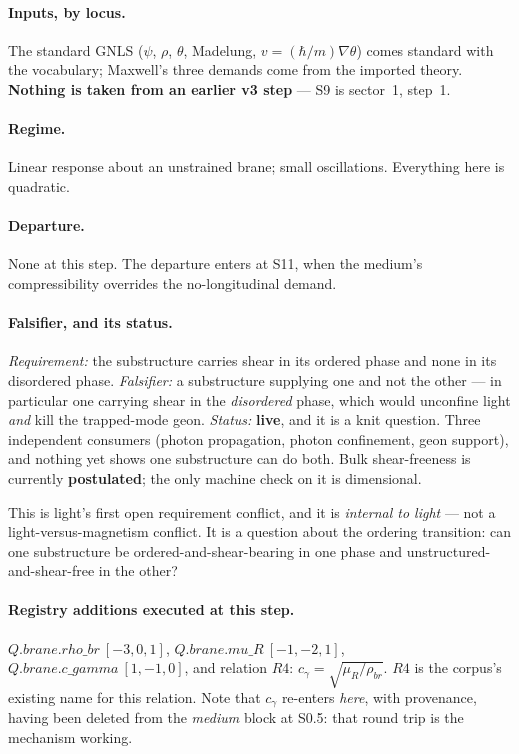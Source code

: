 \paragraph{Inputs, by locus.}
The standard GNLS (\(\psi\), \(\rho\), \(\theta\), Madelung,
\(v=(\hbar/m)\nabla\theta\)) comes standard with the vocabulary; Maxwell's three
demands come from the imported theory. \textbf{Nothing is taken from an earlier
v3 step} --- S9 is sector~1, step~1.

\paragraph{Regime.}
Linear response about an unstrained brane; small oscillations. Everything here
is quadratic.

\paragraph{Departure.}
None at this step. The departure enters at S11, when the medium's
compressibility overrides the no-longitudinal demand.

\paragraph{Falsifier, and its status.}
\emph{Requirement:} the substructure carries shear in its ordered phase and none
in its disordered phase. \emph{Falsifier:} a substructure supplying one and not
the other --- in particular one carrying shear in the \emph{disordered} phase,
which would unconfine light \emph{and} kill the trapped-mode geon.
\emph{Status:} \textbf{live}, and it is a knit question. Three independent
consumers (photon propagation, photon confinement, geon support), and nothing
yet shows one substructure can do both. Bulk shear-freeness is currently
\textbf{postulated}; the only machine check on it is dimensional.

This is light's first open requirement conflict, and it is \emph{internal to
light} --- not a light-versus-magnetism conflict. It is a question about the
ordering transition: can one substructure be ordered-and-shear-bearing in one
phase and unstructured-and-shear-free in the other?

\paragraph{Registry additions executed at this step.}
\(Q.brane.rho\_br\ [-3,0,1]\), \(Q.brane.mu\_R\ [-1,-2,1]\),
\(Q.brane.c\_gamma\ [1,-1,0]\), and relation \(R4\):
\(c_\gamma=\sqrt{\mu_R/\rho_{br}}\). \(R4\) is the corpus's existing name for
this relation. Note that \(c_\gamma\) re-enters \emph{here}, with provenance,
having been deleted from the \emph{medium} block at S0.5: that round trip is the
mechanism working.


